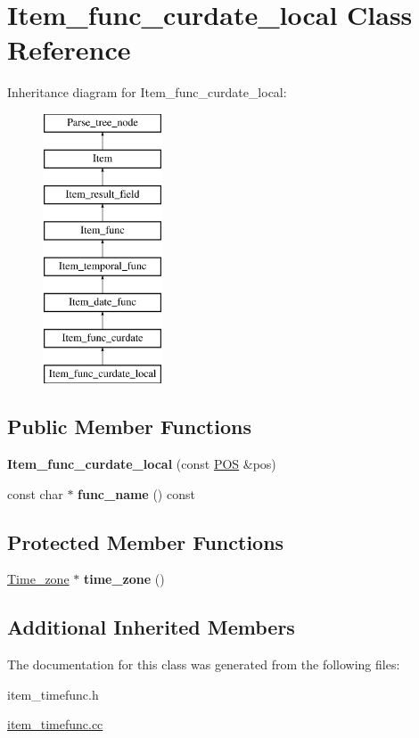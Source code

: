 \hypertarget{classItem__func__curdate__local}{}\section{Item\+\_\+func\+\_\+curdate\+\_\+local Class Reference}
\label{classItem__func__curdate__local}
Inheritance diagram for Item\+\_\+func\+\_\+curdate\+\_\+local\+:\begin{figure}[H]
\begin{center}
\leavevmode
\includegraphics[height=8.000000cm]{classItem__func__curdate__local}
\end{center}
\end{figure}
\subsection*{Public Member Functions}
\begin{DoxyCompactItemize}
\item 
\mbox{\label{classItem__func__curdate__local_ae79021e3a6518f745639efdbaa11d5b1}} 
{\bfseries Item\+\_\+func\+\_\+curdate\+\_\+local} (const \mbox{\hyperlink{structYYLTYPE}{P\+OS}} \&pos)
\item 
\mbox{\label{classItem__func__curdate__local_a034fb0d128cbe03cb92ff0b921e436f9}} 
const char $\ast$ {\bfseries func\+\_\+name} () const
\end{DoxyCompactItemize}
\subsection*{Protected Member Functions}
\begin{DoxyCompactItemize}
\item 
\mbox{\label{classItem__func__curdate__local_ab40469fa6b2144fbe94d7e67b935f15d}} 
\mbox{\hyperlink{classTime__zone}{Time\+\_\+zone}} $\ast$ {\bfseries time\+\_\+zone} ()
\end{DoxyCompactItemize}
\subsection*{Additional Inherited Members}


The documentation for this class was generated from the following files\+:\begin{DoxyCompactItemize}
\item 
item\+\_\+timefunc.\+h\item 
\mbox{\hyperlink{item__timefunc_8cc}{item\+\_\+timefunc.\+cc}}\end{DoxyCompactItemize}
